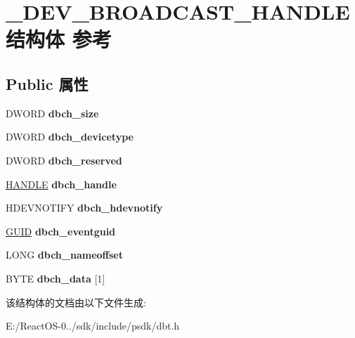 \hypertarget{struct___d_e_v___b_r_o_a_d_c_a_s_t___h_a_n_d_l_e}{}\section{\+\_\+\+D\+E\+V\+\_\+\+B\+R\+O\+A\+D\+C\+A\+S\+T\+\_\+\+H\+A\+N\+D\+L\+E结构体 参考}
\label{struct___d_e_v___b_r_o_a_d_c_a_s_t___h_a_n_d_l_e}
\subsection*{Public 属性}
\begin{DoxyCompactItemize}
\item 
\mbox{\label{struct___d_e_v___b_r_o_a_d_c_a_s_t___h_a_n_d_l_e_a445dd3130a175e728633e02aa755a9cf}} 
D\+W\+O\+RD {\bfseries dbch\+\_\+size}
\item 
\mbox{\label{struct___d_e_v___b_r_o_a_d_c_a_s_t___h_a_n_d_l_e_a387a6ca61afd95e768636e49ee95acba}} 
D\+W\+O\+RD {\bfseries dbch\+\_\+devicetype}
\item 
\mbox{\label{struct___d_e_v___b_r_o_a_d_c_a_s_t___h_a_n_d_l_e_aa1939d144440505b61bcaad767c0f613}} 
D\+W\+O\+RD {\bfseries dbch\+\_\+reserved}
\item 
\mbox{\label{struct___d_e_v___b_r_o_a_d_c_a_s_t___h_a_n_d_l_e_af9d218109a3406f8eaa0e2abb1a73b8b}} 
\hyperlink{interfacevoid}{H\+A\+N\+D\+LE} {\bfseries dbch\+\_\+handle}
\item 
\mbox{\label{struct___d_e_v___b_r_o_a_d_c_a_s_t___h_a_n_d_l_e_a820d2ed553141076ed6efeb3f4282166}} 
H\+D\+E\+V\+N\+O\+T\+I\+FY {\bfseries dbch\+\_\+hdevnotify}
\item 
\mbox{\label{struct___d_e_v___b_r_o_a_d_c_a_s_t___h_a_n_d_l_e_a24e85de8465da1ab16947795763f4617}} 
\hyperlink{interface_g_u_i_d}{G\+U\+ID} {\bfseries dbch\+\_\+eventguid}
\item 
\mbox{\label{struct___d_e_v___b_r_o_a_d_c_a_s_t___h_a_n_d_l_e_aa495d498be51e3b19a94fff329f0e770}} 
L\+O\+NG {\bfseries dbch\+\_\+nameoffset}
\item 
\mbox{\label{struct___d_e_v___b_r_o_a_d_c_a_s_t___h_a_n_d_l_e_aed14e2cc150aeceed46b222b6725a4bd}} 
B\+Y\+TE {\bfseries dbch\+\_\+data} \mbox{[}1\mbox{]}
\end{DoxyCompactItemize}


该结构体的文档由以下文件生成\+:\begin{DoxyCompactItemize}
\item 
E\+:/\+React\+O\+S-\/0../sdk/include/psdk/dbt.\+h\end{DoxyCompactItemize}
